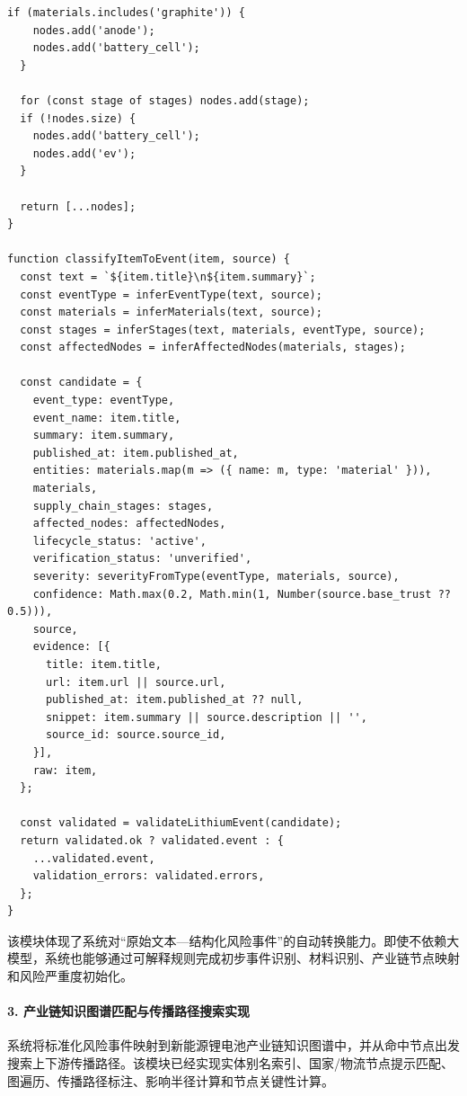 ﻿\documentclass[12pt,a4paper]{article}
\begin{document}
\begin{lstlisting}[style=projectcode,caption={多源新闻条目到风险事件的抽取与映射}]
  if (materials.includes('graphite')) {
    nodes.add('anode');
    nodes.add('battery_cell');
  }

  for (const stage of stages) nodes.add(stage);
  if (!nodes.size) {
    nodes.add('battery_cell');
    nodes.add('ev');
  }

  return [...nodes];
}

function classifyItemToEvent(item, source) {
  const text = `${item.title}\n${item.summary}`;
  const eventType = inferEventType(text, source);
  const materials = inferMaterials(text, source);
  const stages = inferStages(text, materials, eventType, source);
  const affectedNodes = inferAffectedNodes(materials, stages);

  const candidate = {
    event_type: eventType,
    event_name: item.title,
    summary: item.summary,
    published_at: item.published_at,
    entities: materials.map(m => ({ name: m, type: 'material' })),
    materials,
    supply_chain_stages: stages,
    affected_nodes: affectedNodes,
    lifecycle_status: 'active',
    verification_status: 'unverified',
    severity: severityFromType(eventType, materials, source),
    confidence: Math.max(0.2, Math.min(1, Number(source.base_trust ?? 0.5))),
    source,
    evidence: [{
      title: item.title,
      url: item.url || source.url,
      published_at: item.published_at ?? null,
      snippet: item.summary || source.description || '',
      source_id: source.source_id,
    }],
    raw: item,
  };

  const validated = validateLithiumEvent(candidate);
  return validated.ok ? validated.event : {
    ...validated.event,
    validation_errors: validated.errors,
  };
}
\end{lstlisting}

该模块体现了系统对“原始文本—结构化风险事件”的自动转换能力。即使不依赖大模型，系统也能够通过可解释规则完成初步事件识别、材料识别、产业链节点映射和风险严重度初始化。

\paragraph{3. 产业链知识图谱匹配与传播路径搜索实现}

系统将标准化风险事件映射到新能源锂电池产业链知识图谱中，并从命中节点出发搜索上下游传播路径。该模块已经实现实体别名索引、国家/物流节点提示匹配、图遍历、传播路径标注、影响半径计算和节点关键性计算。
\end{document}
